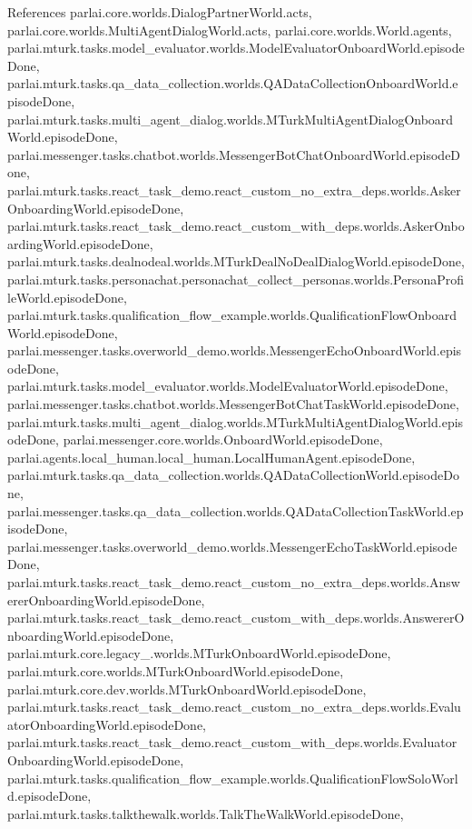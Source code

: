 References parlai.\+core.\+worlds.\+Dialog\+Partner\+World.\+acts, parlai.\+core.\+worlds.\+Multi\+Agent\+Dialog\+World.\+acts, parlai.\+core.\+worlds.\+World.\+agents, parlai.\+mturk.\+tasks.\+model\+\_\+evaluator.\+worlds.\+Model\+Evaluator\+Onboard\+World.\+episode\+Done, parlai.\+mturk.\+tasks.\+qa\+\_\+data\+\_\+collection.\+worlds.\+Q\+A\+Data\+Collection\+Onboard\+World.\+episode\+Done, parlai.\+mturk.\+tasks.\+multi\+\_\+agent\+\_\+dialog.\+worlds.\+M\+Turk\+Multi\+Agent\+Dialog\+Onboard\+World.\+episode\+Done, parlai.\+messenger.\+tasks.\+chatbot.\+worlds.\+Messenger\+Bot\+Chat\+Onboard\+World.\+episode\+Done, parlai.\+mturk.\+tasks.\+react\+\_\+task\+\_\+demo.\+react\+\_\+custom\+\_\+no\+\_\+extra\+\_\+deps.\+worlds.\+Asker\+Onboarding\+World.\+episode\+Done, parlai.\+mturk.\+tasks.\+react\+\_\+task\+\_\+demo.\+react\+\_\+custom\+\_\+with\+\_\+deps.\+worlds.\+Asker\+Onboarding\+World.\+episode\+Done, parlai.\+mturk.\+tasks.\+dealnodeal.\+worlds.\+M\+Turk\+Deal\+No\+Deal\+Dialog\+World.\+episode\+Done, parlai.\+mturk.\+tasks.\+personachat.\+personachat\+\_\+collect\+\_\+personas.\+worlds.\+Persona\+Profile\+World.\+episode\+Done, parlai.\+mturk.\+tasks.\+qualification\+\_\+flow\+\_\+example.\+worlds.\+Qualification\+Flow\+Onboard\+World.\+episode\+Done, parlai.\+messenger.\+tasks.\+overworld\+\_\+demo.\+worlds.\+Messenger\+Echo\+Onboard\+World.\+episode\+Done, parlai.\+mturk.\+tasks.\+model\+\_\+evaluator.\+worlds.\+Model\+Evaluator\+World.\+episode\+Done, parlai.\+messenger.\+tasks.\+chatbot.\+worlds.\+Messenger\+Bot\+Chat\+Task\+World.\+episode\+Done, parlai.\+mturk.\+tasks.\+multi\+\_\+agent\+\_\+dialog.\+worlds.\+M\+Turk\+Multi\+Agent\+Dialog\+World.\+episode\+Done, parlai.\+messenger.\+core.\+worlds.\+Onboard\+World.\+episode\+Done, parlai.\+agents.\+local\+\_\+human.\+local\+\_\+human.\+Local\+Human\+Agent.\+episode\+Done, parlai.\+mturk.\+tasks.\+qa\+\_\+data\+\_\+collection.\+worlds.\+Q\+A\+Data\+Collection\+World.\+episode\+Done, parlai.\+messenger.\+tasks.\+qa\+\_\+data\+\_\+collection.\+worlds.\+Q\+A\+Data\+Collection\+Task\+World.\+episode\+Done, parlai.\+messenger.\+tasks.\+overworld\+\_\+demo.\+worlds.\+Messenger\+Echo\+Task\+World.\+episode\+Done, parlai.\+mturk.\+tasks.\+react\+\_\+task\+\_\+demo.\+react\+\_\+custom\+\_\+no\+\_\+extra\+\_\+deps.\+worlds.\+Answerer\+Onboarding\+World.\+episode\+Done, parlai.\+mturk.\+tasks.\+react\+\_\+task\+\_\+demo.\+react\+\_\+custom\+\_\+with\+\_\+deps.\+worlds.\+Answerer\+Onboarding\+World.\+episode\+Done, parlai.\+mturk.\+core.\+legacy\+\_.\+worlds.\+M\+Turk\+Onboard\+World.\+episode\+Done, parlai.\+mturk.\+core.\+worlds.\+M\+Turk\+Onboard\+World.\+episode\+Done, parlai.\+mturk.\+core.\+dev.\+worlds.\+M\+Turk\+Onboard\+World.\+episode\+Done, parlai.\+mturk.\+tasks.\+react\+\_\+task\+\_\+demo.\+react\+\_\+custom\+\_\+no\+\_\+extra\+\_\+deps.\+worlds.\+Evaluator\+Onboarding\+World.\+episode\+Done, parlai.\+mturk.\+tasks.\+react\+\_\+task\+\_\+demo.\+react\+\_\+custom\+\_\+with\+\_\+deps.\+worlds.\+Evaluator\+Onboarding\+World.\+episode\+Done, parlai.\+mturk.\+tasks.\+qualification\+\_\+flow\+\_\+example.\+worlds.\+Qualification\+Flow\+Solo\+World.\+episode\+Done, parlai.\+mturk.\+tasks.\+talkthewalk.\+worlds.\+Talk\+The\+Walk\+World.\+episode\+Done, 